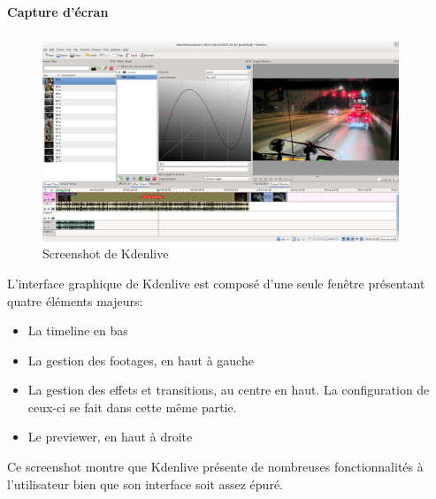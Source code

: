 \newpage\paragraph {Capture d'écran}

\subparagraph{}

\begin{figure}[H]

  \begin{center}

    \includegraphics[width=0.95\textwidth]{images/kdenlive}

  \end{center}

  \caption{Screenshot de Kdenlive}

  \label{Yes}

\end{figure}

L'interface graphique de Kdenlive est composé d'une seule fenêtre
présentant quatre éléments majeurs:

\begin{itemize}

  \item {La timeline en bas}

  \item {La gestion des footages, en haut à gauche}

  \item {La gestion des effets et transitions, au centre en haut. La
  configuration de ceux-ci se fait dans cette même partie.}

  \item {Le previewer, en haut à droite}

\end{itemize}


Ce screenshot montre que Kdenlive présente de nombreuses fonctionnalités
à l'utilisateur bien que son interface soit assez épuré.

